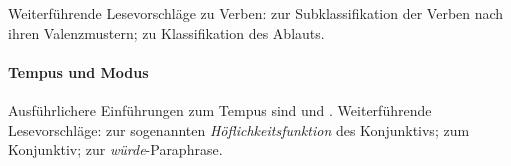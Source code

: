 {\begin{sloppypar}
Weiterführende Lesevorschläge zu Verben:
\citet{HelbigSchenkel1991} zur Subklassifikation der Verben nach ihren Valenzmustern;
\citet{Wiese2008} zu Klassifikation des Ablauts.

\paragraph*{Tempus und Modus}

Ausführlichere Einführungen zum Tempus sind \citet{Rothstein2007} und \citet{Vater2007}.
Weiterführende Lesevorschläge:
\citet{Leibukt2011} zur sogenannten \textit{Höflichkeitsfunktion} des Konjunktivs;
\citet{Fabriciushansen1997} zum Konjunktiv;
\citet{Fabriciushansen2000} zur \textit{würde}-Paraphrase.

\end{sloppypar}

}
